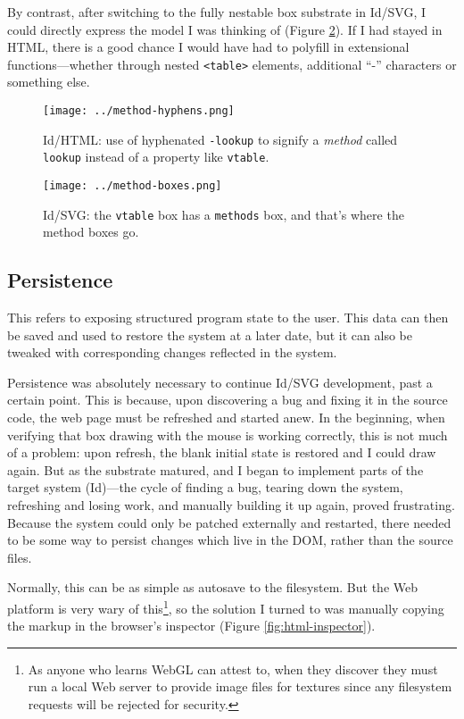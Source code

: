 By contrast, after switching to the fully nestable box substrate in
Id{}/SVG, I could directly express the model I was thinking of (Figure
\ref{fig:method-boxes}). If I had stayed in HTML, there is a good chance
I would have had to polyfill in extensional functions---whether through
nested \texttt{\textless{}table\textgreater{}} elements, additional
``-'' characters or something else.

\begin{figure}[h]
  \centering
  \texttt{[image: ../method-hyphens.png]}
  \caption{Id{}/HTML: use of hyphenated \texttt{-lookup} to signify a \emph{method} called
           \texttt{lookup} instead of a property like \texttt{vtable}. \label{fig:method-hyphens}}
\end{figure}

\begin{figure}[h]
  \centering
  \texttt{[image: ../method-boxes.png]}
  \caption{Id{}/SVG: the \texttt{vtable} box has a \texttt{methods} box, and that's where the method boxes go. \label{fig:method-boxes}}
\end{figure}

\hypertarget{persistence}{%
\subsection{Persistence}\label{persistence}}

This refers to exposing structured program state to the user. This data
can then be saved and used to restore the system at a later date, but it
can also be tweaked with corresponding changes reflected in the system.

Persistence was absolutely necessary to continue Id{}/SVG development,
past a certain point. This is because, upon discovering a bug and fixing
it in the source code, the web page must be refreshed and started anew.
In the beginning, when verifying that box drawing with the mouse is
working correctly, this is not much of a problem: upon refresh, the
blank initial state is restored and I could draw again. But as the
substrate matured, and I began to implement parts of the target system
(Id{})---the cycle of finding a bug, tearing down the system, refreshing
and losing work, and manually building it up again, proved frustrating.
Because the system could only be patched externally and restarted, there
needed to be some way to persist changes which live in the DOM, rather
than the source files.

Normally, this can be as simple as autosave to the filesystem. But the
Web platform is very wary of this\footnote{As anyone who learns WebGL
  can attest to, when they discover they must run a local Web server to
  provide image files for textures since any filesystem requests will be
  rejected for security.}, so the solution I turned to was manually
copying the markup in the browser's inspector (Figure
\ref{fig:html-inspector}).

